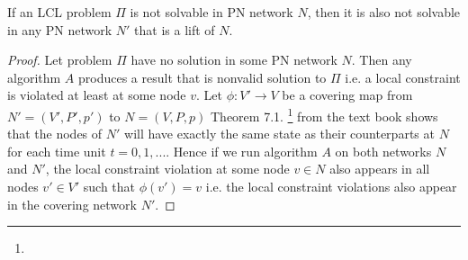 \begin{theorem} \label{thm:lcl_nonsolvability:2}
If an LCL problem $\Pi$ is not solvable in PN network $N$, then it is also not solvable in any PN network $N'$ that is a lift of $N$.
\end{theorem}
\begin{proof}
    Let problem $\Pi$ have no solution in some PN network $N$.
    Then any algorithm $A$ produces a result that is nonvalid solution to $\Pi$ i.e. a local constraint is violated at least at some node $v$.
    Let $\phi: V' \rightarrow V$ be a covering map from $N'=(V', P', p')$ to $N=(V, P, p)$
    Theorem 7.1. \footnote{} from the text book \cite{HirvonenSuomelaDistAlg2020} shows that the nodes of $N'$ will have exactly the same state as their counterparts at $N$ for each time unit $t=0,1,...$.
    Hence if we run algorithm $A$ on both networks $N$ and $N'$, the local constraint violation at some node $v \in N$ also appears in all nodes $v' \in V'$ such that $\phi(v') = v$ i.e. the local constraint violations also appear in the covering network $N'$.
\end{proof}

